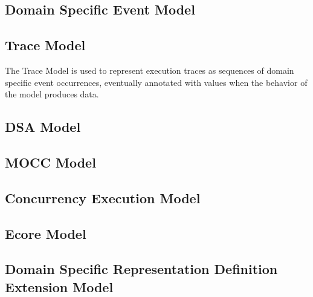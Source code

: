 \documentclass{gemoc} %
\begin{document}

\subsection{Domain Specific Event Model}


\subsection{Trace Model}
The Trace Model is used to represent execution traces as sequences of domain specific event occurrences, eventually annotated with values when the behavior of the model produces data.

\subsection{DSA Model}


\subsection{MOCC Model}


\subsection{Concurrency Execution Model}


\subsection{Ecore Model}


\subsection{Domain Specific Representation Definition Extension Model}

\end{document}

